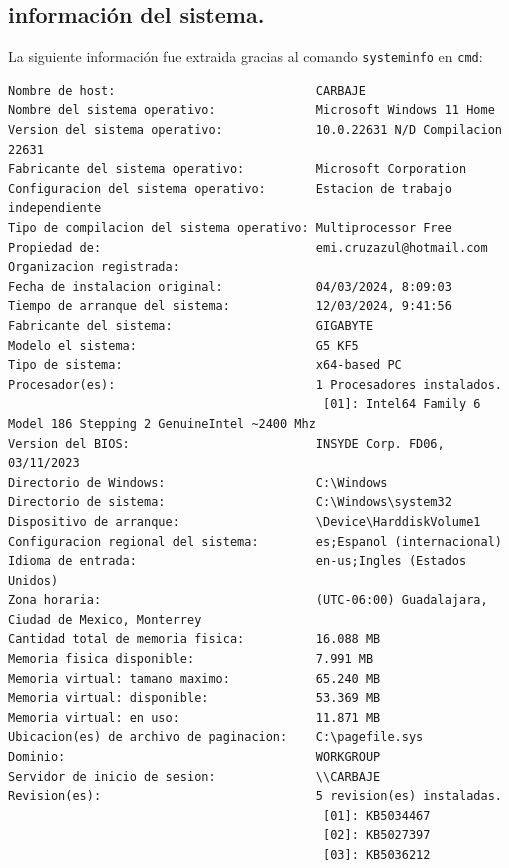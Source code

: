 \documentclass{article}
\begin{document}
    \subsection[Especificaciones]{información del sistema.}
    La siguiente información fue extraida gracias al comando \texttt{systeminfo} en \texttt{cmd}: %
        \begin{lstlisting}[language={},basicstyle=\ttfamily\footnotesize]
Nombre de host:                            CARBAJE
Nombre del sistema operativo:              Microsoft Windows 11 Home
Version del sistema operativo:             10.0.22631 N/D Compilacion 22631
Fabricante del sistema operativo:          Microsoft Corporation
Configuracion del sistema operativo:       Estacion de trabajo independiente
Tipo de compilacion del sistema operativo: Multiprocessor Free
Propiedad de:                              emi.cruzazul@hotmail.com
Organizacion registrada:
Fecha de instalacion original:             04/03/2024, 8:09:03
Tiempo de arranque del sistema:            12/03/2024, 9:41:56
Fabricante del sistema:                    GIGABYTE
Modelo el sistema:                         G5 KF5
Tipo de sistema:                           x64-based PC
Procesador(es):                            1 Procesadores instalados.
                                            [01]: Intel64 Family 6 Model 186 Stepping 2 GenuineIntel ~2400 Mhz
Version del BIOS:                          INSYDE Corp. FD06, 03/11/2023
Directorio de Windows:                     C:\Windows
Directorio de sistema:                     C:\Windows\system32
Dispositivo de arranque:                   \Device\HarddiskVolume1
Configuracion regional del sistema:        es;Espanol (internacional)
Idioma de entrada:                         en-us;Ingles (Estados Unidos)
Zona horaria:                              (UTC-06:00) Guadalajara, Ciudad de Mexico, Monterrey
Cantidad total de memoria fisica:          16.088 MB
Memoria fisica disponible:                 7.991 MB
Memoria virtual: tamano maximo:            65.240 MB
Memoria virtual: disponible:               53.369 MB
Memoria virtual: en uso:                   11.871 MB
Ubicacion(es) de archivo de paginacion:    C:\pagefile.sys
Dominio:                                   WORKGROUP
Servidor de inicio de sesion:              \\CARBAJE
Revision(es):                              5 revision(es) instaladas.
                                            [01]: KB5034467
                                            [02]: KB5027397
                                            [03]: KB5036212

\end{lstlisting}
\end{document}
